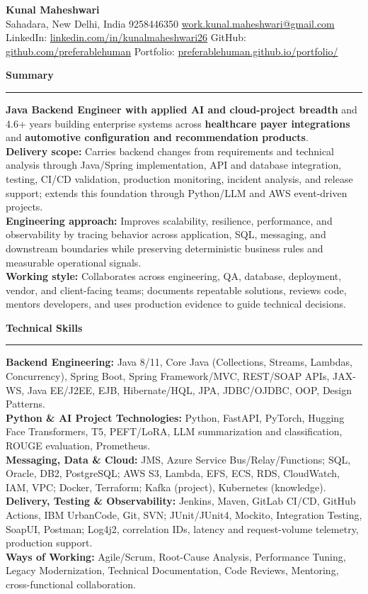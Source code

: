 \documentclass[11pt,letterpaper]{article}
\newcommand{\ressection}[1]{\Needspace{6\baselineskip}\vspace{8pt}\par\textbf{#1}\par\vspace{2pt}\hrule\vspace{5pt}}
\begin{document}
\pagestyle{empty}\raggedright\fontsize{11}{12.5}\selectfont

{\Large \textbf{Kunal Maheshwari}}\\
Sahadara, New Delhi, India \textbar{} 9258446350 \textbar{} \href{mailto:work.kunal.maheshwari@gmail.com}{work.kunal.maheshwari@gmail.com}\\
LinkedIn: \href{https://www.linkedin.com/in/kunalmaheshwari26}{linkedin.com/in/kunalmaheshwari26} \textbar{} GitHub: \href{https://github.com/preferablehuman}{github.com/preferablehuman} \textbar{} Portfolio: \href{https://preferablehuman.github.io/portfolio/}{preferablehuman.github.io/portfolio/}

\ressection{Summary}
\textbf{Java Backend Engineer with applied AI and cloud-project breadth} and 4.6+ years building enterprise systems across \textbf{healthcare payer integrations} and \textbf{automotive configuration and recommendation products}.\\[2pt]
\textbf{Delivery scope:} Carries backend changes from requirements and technical analysis through Java/Spring implementation, API and database integration, testing, CI/CD validation, production monitoring, incident analysis, and release support; extends this foundation through Python/LLM and AWS event-driven projects.\\[2pt]
\textbf{Engineering approach:} Improves scalability, resilience, performance, and observability by tracing behavior across application, SQL, messaging, and downstream boundaries while preserving deterministic business rules and measurable operational signals.\\[2pt]
\textbf{Working style:} Collaborates across engineering, QA, database, deployment, vendor, and client-facing teams; documents repeatable solutions, reviews code, mentors developers, and uses production evidence to guide technical decisions.

\ressection{Technical Skills}
\textbf{Backend Engineering:} Java 8/11, Core Java (Collections, Streams, Lambdas, Concurrency), Spring Boot, Spring Framework/MVC, REST/SOAP APIs, JAX-WS, Java EE/J2EE, EJB, Hibernate/HQL, JPA, JDBC/OJDBC, OOP, Design Patterns.\\
\textbf{Python \& AI Project Technologies:} Python, FastAPI, PyTorch, Hugging Face Transformers, T5, PEFT/LoRA, LLM summarization and classification, ROUGE evaluation, Prometheus.\\
\textbf{Messaging, Data \& Cloud:} JMS, Azure Service Bus/Relay/Functions; SQL, Oracle, DB2, PostgreSQL; AWS S3, Lambda, EFS, ECS, RDS, CloudWatch, IAM, VPC; Docker, Terraform; Kafka (project), Kubernetes (knowledge).\\
\textbf{Delivery, Testing \& Observability:} Jenkins, Maven, GitLab CI/CD, GitHub Actions, IBM UrbanCode, Git, SVN; JUnit/JUnit4, Mockito, Integration Testing, SoapUI, Postman; Log4j2, correlation IDs, latency and request-volume telemetry, production support.\\
\textbf{Ways of Working:} Agile/Scrum, Root-Cause Analysis, Performance Tuning, Legacy Modernization, Technical Documentation, Code Reviews, Mentoring, cross-functional collaboration.
\end{document}
